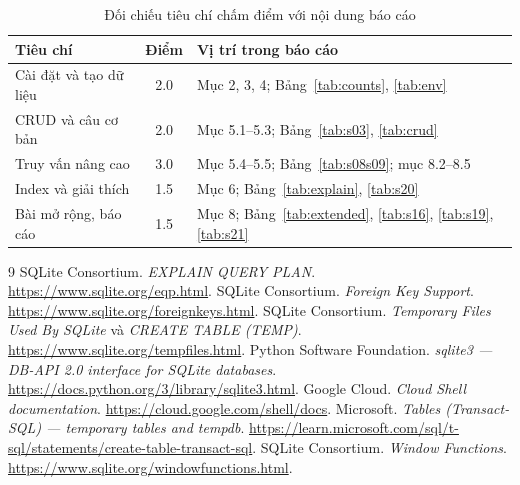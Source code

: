 \documentclass[12pt,a4paper]{article}
\begin{document}
\begin{table}[H]
\centering
\caption{Đối chiếu tiêu chí chấm điểm với nội dung báo cáo}
\label{tab:rubric}
\small
\begin{tabularx}{\linewidth}{@{}X c l@{}}
\toprule
\textbf{Tiêu chí} & \textbf{Điểm} & \textbf{Vị trí trong báo cáo} \\
\midrule
Cài đặt và tạo dữ liệu & 2.0 & Mục 2, 3, 4; Bảng~\ref{tab:counts}, \ref{tab:env} \\
CRUD và câu cơ bản & 2.0 & Mục 5.1--5.3; Bảng~\ref{tab:s03}, \ref{tab:crud} \\
Truy vấn nâng cao & 3.0 & Mục 5.4--5.5; Bảng~\ref{tab:s08s09}; mục 8.2--8.5 \\
Index và giải thích & 1.5 & Mục 6; Bảng~\ref{tab:explain}, \ref{tab:s20} \\
Bài mở rộng, báo cáo & 1.5 & Mục 8; Bảng~\ref{tab:extended}, \ref{tab:s16}, \ref{tab:s19}, \ref{tab:s21} \\
\bottomrule
\end{tabularx}
\end{table}

\fi
\clearpage
\begin{thebibliography}{9}
\small
{} SQLite Consortium. \emph{EXPLAIN QUERY PLAN}.
  \url{https://www.sqlite.org/eqp.html}.
 SQLite Consortium. \emph{Foreign Key Support}.
  \url{https://www.sqlite.org/foreignkeys.html}.
 SQLite Consortium. \emph{Temporary Files Used By SQLite} và
  \emph{CREATE TABLE (TEMP)}. \url{https://www.sqlite.org/tempfiles.html}.
 Python Software Foundation. \emph{sqlite3 --- DB-API 2.0 interface for SQLite
  databases}. \url{https://docs.python.org/3/library/sqlite3.html}.
 Google Cloud. \emph{Cloud Shell documentation}.
  \url{https://cloud.google.com/shell/docs}.
 Microsoft. \emph{Tables (Transact-SQL) --- temporary tables and tempdb}.
  \url{https://learn.microsoft.com/sql/t-sql/statements/create-table-transact-sql}.
 SQLite Consortium. \emph{Window Functions}.
  \url{https://www.sqlite.org/windowfunctions.html}.
\end{thebibliography}
\end{document}
